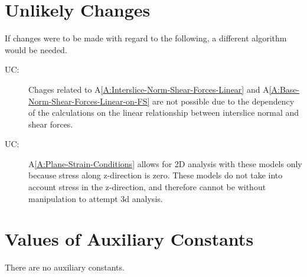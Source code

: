 \documentclass[12pt]{article}
\newcounter{ucnum}
\newcommand{\uctheucnum}{UC\theucnum}
\begin{document}
\section{Unlikely Changes}
\label{Sec:UCs}
If changes were to be made with regard to the following, a different algorithm would be needed.
\begin{description}
\item[\uctheucnum\label{UC:UC.normshearlinear}:]Chages related to A\ref{A:Interslice-Norm-Shear-Forces-Linear} and A\ref{A:Base-Norm-Shear-Forces-Linear-on-FS} are not possible due to the dependency of the calculations on the linear relationship between interslice normal and shear forces.
\end{description}
\begin{description}
\item[\uctheucnum\label{UC:UC.2donly}:]A\ref{A:Plane-Strain-Conditions} allows for 2D analysis with these models only because stress along z-direction is zero. These models do not take into account stress in the z-direction, and therefore cannot be without manipulation to attempt 3d analysis.
\end{description}
\section{Values of Auxiliary Constants}
\label{Sec:AuxConstants}
There are no auxiliary constants.
\end{document}

